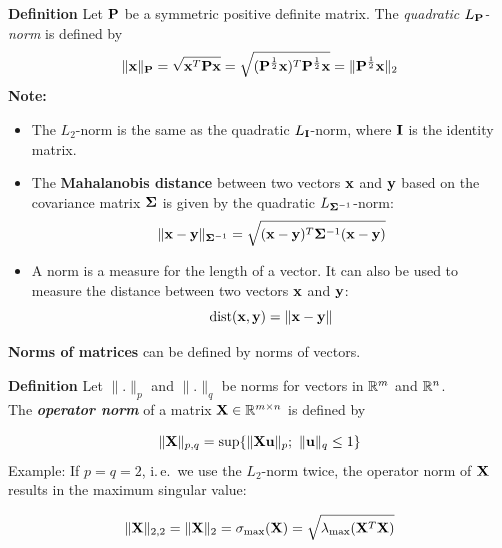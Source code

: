   \textbf{Definition}
    Let $\mathbf{P}$ be a symmetric positive definite matrix.    The \emph{quadratic $L_{\mathbf{P}}$-norm} is defined by 
    \begin{displaymath}
      \| \bm{\mathrm{x}}\|_{\mathbf{P}} = 
      \sqrt{ \bm{\mathrm{x}}^T \mathbf{P} \bm{\mathrm{x}}} = 
      \sqrt{ (\mathbf{P}^\frac{1}{2} \bm{\mathrm{x}})^T \mathbf{P}^\frac{1}{2} \bm{\mathrm{x}}} =
      \| \mathbf{P}^\frac{1}{2} \bm{\mathrm{x}}\|_2
    \end{displaymath}
  \textbf{Note:} 

  \begin{itemize}
    \item The $L_2$-norm is the same as the quadratic $L_{\mathbf{I}}$-norm, where $\mathbf{I}$ is the identity matrix.
    \item The \textbf{Mahalanobis distance} between two vectors $\bm{\mathrm{x}}$ and $\bm{\mathrm{y}}$ based on the covariance matrix $\mathbf{\Sigma}$ is given by the quadratic $L_{\mathbf{\Sigma}^{-1}}$-norm:
      \begin{displaymath}
        \| \bm{\mathrm{x}} - \bm{\mathrm{y}}\|_{\mathbf{\Sigma}^{-1}} = 
        \sqrt{ (\bm{\mathrm{x}} - \bm{\mathrm{y}})^T \mathbf{\Sigma}^{-1} (\bm{\mathrm{x}} - \bm{\mathrm{y}})}
      \end{displaymath}
    \item A norm is a measure for the length of a vector. It can also be used to measure the distance between two vectors $\bm{\mathrm{x}}$ and $\bm{\mathrm{y}}$:
      \begin{displaymath}
        \mbox{dist}(\bm{\mathrm{x}}, \bm{\mathrm{y}}) = \| \bm{\mathrm{x}} - \bm{\mathrm{y}}\|
      \end{displaymath}
  \end{itemize}
  \textbf{Norms of matrices} can be defined by norms of vectors.
  
  \textbf{Definition}
    \small
    Let $\|.\|_p$ and $\|.\|_q$ be norms for vectors in $\mathbb{R}^m$ and $\mathbb{R}^n$. \\
    The \textbf{\emph{operator norm}} of a matrix $\mathbf{X}\in \mathbb{R}^{m\times n}$  is defined by
 
    \begin{displaymath}
      \| \mathbf{X}\|_{p,q} = \sup\{ \| \mathbf{X} \bm{\mathrm{u}}\|_p ; \  \| \bm{\mathrm{u}}\|_q\leq 1 \}
    \end{displaymath}
  Example: If $p=q=2$, i.\,e.\ we use the $L_2$-norm twice, the operator norm of $\mathbf{X}$ results in the maximum singular value:
    
    \begin{displaymath}
      \| \mathbf{X}\|_{2,2}=   \| \mathbf{X}\|_{2} = \sigma_{\max}{(\mathbf{X})}= \sqrt{\lambda_{\max}(\mathbf{X}^T\mathbf{X})}
    \end{displaymath}

